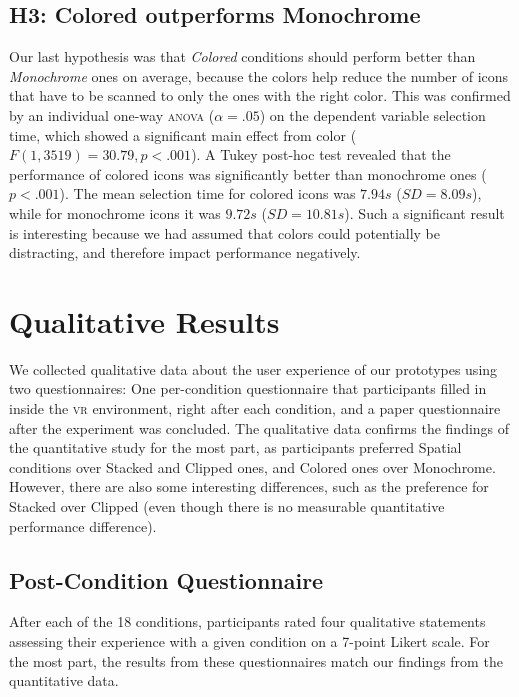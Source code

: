 \documentclass[nobib]{tufte-book} %
\begin{document}
\subsection{H3: Colored outperforms Monochrome}
Our last hypothesis was that \emph{Colored} conditions should perform better than \emph{Monochrome} ones on average, because the colors help reduce the number of icons that have to be scanned to only the ones with the right color. This was confirmed by an individual one-way \textsc{anova} ($\alpha = .05$) on the dependent variable selection time, which showed a significant main effect from color ($F(1,3519) = 30.79, p < .001$).
A Tukey post-hoc test revealed that the performance of colored icons was significantly better than monochrome ones ($p < .001$). The mean selection time for colored icons was $7.94 s$ ($SD = 8.09 s$), while for monochrome icons it was $9.72 s$ ($SD = 10.81 s$). Such a significant result is interesting because we had assumed that colors could potentially be distracting, and therefore impact performance negatively.

\section{Qualitative Results}

We collected qualitative data about the user experience of our prototypes using two questionnaires: One per-condition questionnaire that participants filled in inside the \textsc{vr} environment, right after each condition, and a paper questionnaire after the experiment was concluded. The qualitative data confirms the findings of the quantitative study for the most part, as participants preferred Spatial conditions over Stacked and Clipped ones, and Colored ones over Monochrome. However, there are also some interesting differences, such as the preference for Stacked over Clipped (even though there is no measurable quantitative performance difference).

\subsection{Post-Condition Questionnaire}
After each of the 18 conditions, participants rated four qualitative statements assessing their experience with a given condition on a 7-point Likert scale. For the most part, the results from these questionnaires match our findings from the quantitative data.
\end{document}
